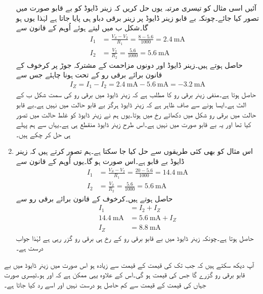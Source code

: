 \begin{enumerate}
آئیں اسی مثال کو تیسری مرتبہ یوں حل کریں کہ زینر ڈایوڈ کو بے قابو صورت میں تصور کیا جائے۔چونکہ بے قابو زینر ڈایوڈ پر زینر برقی دباو ہی پایا جاتا ہے لہٰذا یوں  ہو گا۔شکل  ب میں  لیتے ہوئے  اُوہم کے قانون سے
\begin{align*}
I_1&=\frac{V_S-V_2}{R_1}=\frac{8-5.6}{1000}=\SI{2.4}{\milli \ampere}\\
I_2&=\frac{V_2}{R_2}=\frac{5.6}{1000}=\SI{5.6}{\milli \ampere}
\end{align*}
حاصل ہوتے ہیں۔زینر ڈایوڈ اور دونوں مزاحمت کے مشترکہ جوڑ پر کرخوف کے قانون برائے برقی رو کے تحت   ہونا چاہئے جس سے
\begin{align*}
I_Z=I_1-I_2=\SI{2.4}{\milli \ampere}-\SI{5.6}{\milli \ampere}=\SI{-3.2}{\milli \ampere}
\end{align*}
حاصل ہوتا ہے۔منفی زینر برقی رو کا مطلب ہے کہ زینر ڈایوڈ میں برقی رو کی سمت شکل  ب  کے الٹ ہے۔ایسا ہونے سے صاف ظاہر ہے کہ زینر ڈایوڈ ہرگز بے قابو حالت میں نہیں ہے۔بے قابو حالت میں برقی رو شکل میں دکھائے رخ میں ہوتا۔یوں ہم نے زینر ڈایوڈ کو غلط حالت میں تصور کیا تھا اور یہ بے قابو صورت میں نہیں ہے۔اس طرح زینر ڈایوڈ منقطع ہی ہے۔یہاں سے ہم پہلے ہی حل کر چکے ہیں۔
\item
اس مثال کو بھی کئی طریقوں سے حل کیا جا سکتا ہے۔ہم تصور کرتے ہیں کہ زینر ڈایوڈ بے قابو ہے۔اس صورت   ہو گا۔یوں  اُوہم کے قانون سے
\begin{align*}
I_1&=\frac{V_S-V_2}{R_1}=\frac{20-5.6}{1000}=\SI{14.4}{\milli \ampere}\\
I_2&=\frac{V_2}{R_2}=\frac{5.6}{1000}=\SI{5.6}{\milli \ampere}
\end{align*}
حاصل ہوتے ہیں۔کرخوف کے قانون برائے برقی رو سے
\begin{align*}
I_1&=I_2+I_Z\\
\SI{14.4}{\milli \ampere}&=\SI{5.6}{\milli \ampere}+I_Z\\
I_Z&=\SI{8.8}{\milli \ampere}
\end{align*}
حاصل ہوتا ہے۔چونکہ زینر ڈایوڈ میں بے قابو برقی رو کے رخ ہی برقی رو گزر رہی ہے لہٰذا جواب درست ہے۔
\end{enumerate}


آپ دیکھ سکتے ہیں کہ جب تک  کی قیمت  کے قیمت سے زیادہ ہو اس صورت میں زینر ڈایوڈ میں بے قابو برقی رو گزرے گا جس کی قیمت   ہو گی۔اس کے علاوہ یہی ممکن ہے کہ    اور    ہو۔تیسری صورت جہاں  کی قیمت  کے قیمت سے کم حاصل ہو درست نہیں اور اسے رد کیا جاتا ہے۔ 

